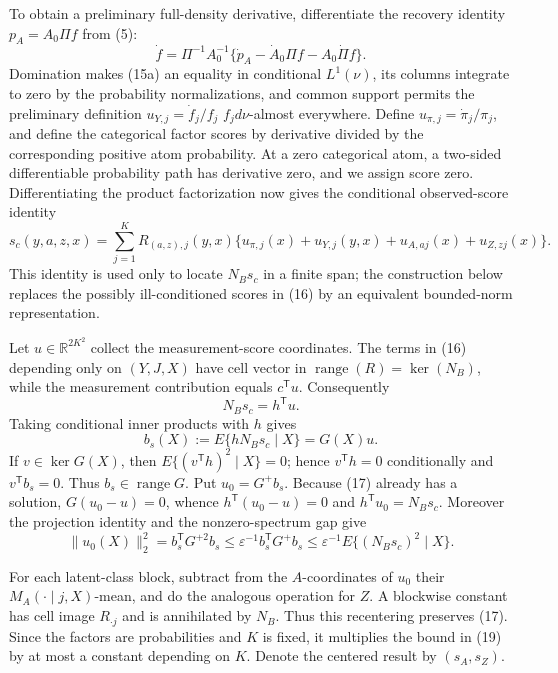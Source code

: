 To obtain a preliminary full-density derivative, differentiate the recovery identity \(p_A=A_0\Pi f\) from (5):
\[
\dot f=\Pi^{-1}A_0^{-1}
 \{\dot p_A-\dot A_0\Pi f-A_0\dot\Pi f\}. \tag{15a}
\]
Domination makes (15a) an equality in conditional \(L^1(\nu)\), its columns integrate to zero by the probability normalizations, and common support permits the preliminary definition \(u_{Y,j}=\dot f_j/f_j\) \(f_jd\nu\)-almost everywhere.  Define \(u_{\pi,j}=\dot\pi_j/\pi_j\), and define the categorical factor scores by derivative divided by the corresponding positive atom probability.  At a zero categorical atom, a two-sided differentiable probability path has derivative zero, and we assign score zero.  Differentiating the product factorization now gives the conditional observed-score identity
\[
s_c(y,a,z,x)=\sum_{j=1}^KR_{(a,z),j}(y,x)
 \{u_{\pi,j}(x)+u_{Y,j}(y,x)+u_{A,aj}(x)+u_{Z,zj}(x)\}. \tag{16}
\]
This identity is used only to locate \(N_Bs_c\) in a finite span; the construction below replaces the possibly ill-conditioned scores in (16) by an equivalent bounded-norm representation.

Let \(u\in\mathbb R^{2K^2}\) collect the measurement-score coordinates.  The terms in (16) depending only on \((Y,J,X)\) have cell vector in \(\operatorname{range}(R)=\ker(N_B)\), while the measurement contribution equals \(c^{\mathsf T}u\).  Consequently
\[
N_Bs_c=h^{\mathsf T}u. \tag{17}
\]
Taking conditional inner products with \(h\) gives
\[
b_s(X):=E\{hN_Bs_c\mid X\}=G(X)u. \tag{18}
\]
If \(v\in\ker G(X)\), then \(E\{(v^{\mathsf T}h)^2\mid X\}=0\); hence \(v^{\mathsf T}h=0\) conditionally and \(v^{\mathsf T}b_s=0\).  Thus \(b_s\in\operatorname{range}G\).  Put \(u_0=G^+b_s\).  Because (17) already has a solution, \(G(u_0-u)=0\), whence \(h^{\mathsf T}(u_0-u)=0\) and \(h^{\mathsf T}u_0=N_Bs_c\).  Moreover the projection identity and the nonzero-spectrum gap give
\[
\|u_0(X)\|_2^2
=b_s^{\mathsf T}G^{+2}b_s
\leq\varepsilon^{-1}b_s^{\mathsf T}G^+b_s
\leq\varepsilon^{-1}E\{(N_Bs_c)^2\mid X\}. \tag{19}
\]

For each latent-class block, subtract from the \(A\)-coordinates of \(u_0\) their \(M_A(\cdot\mid j,X)\)-mean, and do the analogous operation for \(Z\).  A blockwise constant has cell image \(R_{\cdot j}\) and is annihilated by \(N_B\).  Thus this recentering preserves (17).  Since the factors are probabilities and \(K\) is fixed, it multiplies the bound in (19) by at most a constant depending on \(K\).  Denote the centered result by \((s_A,s_Z)\).

